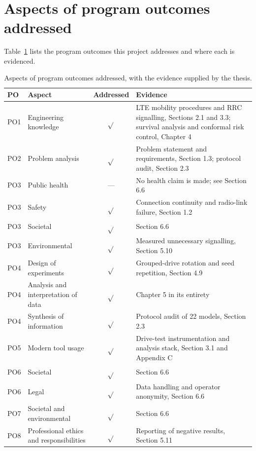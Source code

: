 \section{Aspects of program outcomes addressed}
\label{sec:6_3}

Table~\ref{tab:6_2} lists the program outcomes this project addresses and where each is evidenced.


\begin{table}[htbp]
\centering
\caption{Aspects of program outcomes addressed, with the evidence supplied by the thesis.}
\label{tab:6_2}
\vspace{0.4em}
\singlespacing
\small
\begin{tabularx}{\linewidth}{l >{\raggedright\arraybackslash}p{4.2cm} c X}
\toprule
\textbf{PO} & \textbf{Aspect} & \textbf{Addressed} & \textbf{Evidence} \\
\midrule
PO1 & Engineering knowledge & $\sqrt{}$ & LTE mobility procedures and RRC signalling, Sections 2.1 and 3.3; survival analysis and conformal risk control, Chapter 4 \\
PO2 & Problem analysis & $\sqrt{}$ & Problem statement and requirements, Section 1.3; protocol audit, Section 2.3 \\
PO3 & Public health & --- & No health claim is made; see Section 6.6 \\
PO3 & Safety & $\sqrt{}$ & Connection continuity and radio-link failure, Section 1.2 \\
PO3 & Societal & $\sqrt{}$ & Section 6.6 \\
PO3 & Environmental & $\sqrt{}$ & Measured unnecessary signalling, Section 5.10 \\
PO4 & Design of experiments & $\sqrt{}$ & Grouped-drive rotation and seed repetition, Section 4.9 \\
PO4 & Analysis and interpretation of data & $\sqrt{}$ & Chapter 5 in its entirety \\
PO4 & Synthesis of information & $\sqrt{}$ & Protocol audit of 22 models, Section 2.3 \\
PO5 & Modern tool usage & $\sqrt{}$ & Drive-test instrumentation and analysis stack, Section 3.1 and Appendix C \\
PO6 & Societal & $\sqrt{}$ & Section 6.6 \\
PO6 & Legal & $\sqrt{}$ & Data handling and operator anonymity, Section 6.6 \\
PO7 & Societal and environmental & $\sqrt{}$ & Section 6.6 \\
PO8 & Professional ethics and responsibilities & $\sqrt{}$ & Reporting of negative results, Section 5.11 \\

\end{tabularx}
\end{table}
